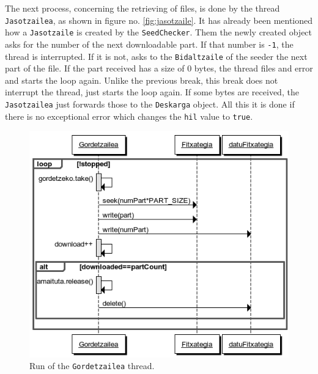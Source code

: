 The next process, concerning the retrieving of files, is done by the thread \texttt{Jasotzailea}, as shown in figure no. \ref{fig:jasotzaile}. It has already been mentioned how a \texttt{Jasotzaile} is created by the \texttt{SeedChecker}. Them the newly created object asks for the number of the next downloadable part. If that number is \texttt{-1}, the thread is interrupted. If it is not, asks to the \texttt{Bidaltzaile} of the seeder the next part of the file. If the part received has a size of 0 bytes, the thread files and error and starts the loop again. Unlike the previous break, this break does not interrupt the thread, just starts the loop again. If some bytes are received, the \texttt{Jasotzailea} just forwards those to the \texttt{Deskarga} object. All this it is done if there is no exceptional error which changes the \texttt{hil} value to \texttt{true}.

\begin{figure}
   \centering
   \includegraphics[scale=0.6]{irudiak/gordetzaileruna.png}
   \caption{Run of the \texttt{Gordetzailea} thread.}
   \label{fig:gordetzailea}
\end{figure}  

